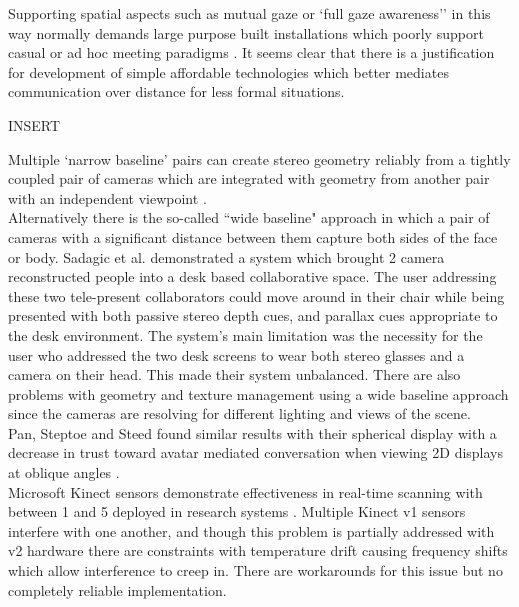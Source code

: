             Supporting spatial aspects such as mutual gaze or `full gaze awareness'' \cite{Monk2002} in this way normally demands large purpose built installations which poorly support casual or ad hoc meeting paradigms \cite{Schroeder2001, Wolff2008}. It seems clear that there is a justification for development of simple affordable technologies which better mediates communication over distance for less formal situations.   

INSERT


Multiple `narrow baseline' pairs can create stereo geometry reliably from a tightly coupled pair of cameras which are integrated with geometry from another pair with an independent viewpoint \cite{Okutomi:1993ez, Cooke2002, Cooke2002a}. \\
Alternatively there is the so-called ``wide baseline" approach in which a pair of cameras with a significant distance between them capture both sides of the face or body. Sadagic et al. demonstrated a system which brought 2 camera reconstructed \cite{Sadagic2001} people into a desk based collaborative space. The user addressing these two tele-present collaborators could move around in their chair while being presented with both passive stereo depth cues, and parallax cues appropriate to the desk environment. The system's main limitation was the necessity for the user who addressed the two desk screens to wear both stereo glasses and a camera on their head. This made their system unbalanced.  There are also problems with geometry and texture management using a wide baseline approach since the cameras are resolving for different lighting and views of the scene.\\
      Pan, Steptoe and Steed found similar results with their spherical display with a decrease in trust toward avatar mediated conversation when viewing 2D displays at oblique angles \cite{pan2014comparing}.\\
Microsoft Kinect sensors demonstrate effectiveness in real-time scanning with between 1 and 5 deployed in research systems \cite{Mekuria2013}. Multiple Kinect v1 sensors interfere with one another, and though this problem is partially addressed with v2 hardware there are constraints with temperature drift causing frequency shifts which allow interference to creep in. There are workarounds for this issue but no completely reliable implementation.\\

